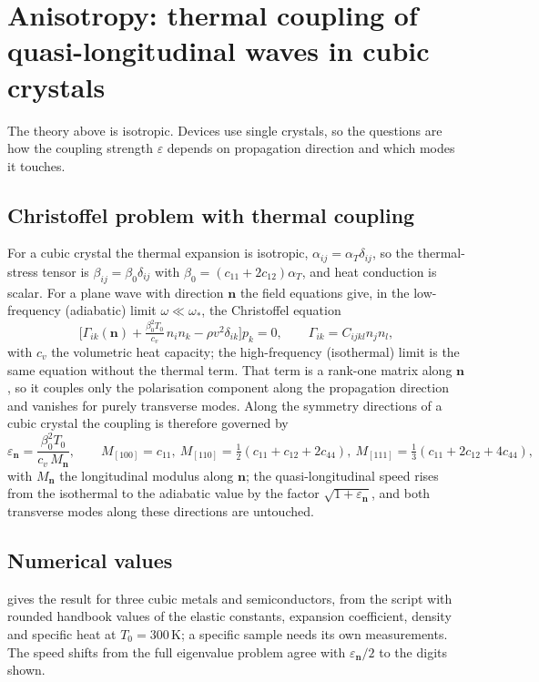 \section{Anisotropy: thermal coupling of quasi-longitudinal waves in cubic crystals}\label{sec:aniso}

The theory above is isotropic. Devices use single crystals, so the questions are how the coupling strength $\varepsilon$ depends on propagation direction and which modes it touches.

\subsection{Christoffel problem with thermal coupling}
For a cubic crystal the thermal expansion is isotropic, $\alpha_{ij}=\alpha_T\delta_{ij}$, so the thermal-stress tensor is $\beta_{ij}=\beta_0\delta_{ij}$ with $\beta_0=(c_{11}+2c_{12})\alpha_T$, and heat conduction is scalar. For a plane wave with direction $\bm n$ the field equations give, in the low-frequency (adiabatic) limit $\omega\ll\omega_*$, the Christoffel equation
\begin{equation}\label{eq:christ}
\bigl[\Gamma_{ik}(\bm n)+\tfrac{\beta_0^2T_0}{c_v}\,n_in_k-\rho v^2\delta_{ik}\bigr]p_k=0,\qquad \Gamma_{ik}=C_{ijkl}n_jn_l,
\end{equation}
with $c_v$ the volumetric heat capacity; the high-frequency (isothermal) limit is the same equation without the thermal term. That term is a rank-one matrix along $\bm n$, so it couples only the polarisation component along the propagation direction and vanishes for purely transverse modes. Along the symmetry directions of a cubic crystal the coupling is therefore governed by
\begin{equation}\label{eq:epsdir}
\varepsilon_{\bm n}=\frac{\beta_0^2T_0}{c_v\,M_{\bm n}},\qquad M_{[100]}=c_{11},\ M_{[110]}=\tfrac12(c_{11}+c_{12}+2c_{44}),\ M_{[111]}=\tfrac13(c_{11}+2c_{12}+4c_{44}),
\end{equation}
with $M_{\bm n}$ the longitudinal modulus along $\bm n$; the quasi-longitudinal speed rises from the isothermal to the adiabatic value by the factor $\sqrt{1+\varepsilon_{\bm n}}$, and both transverse modes along these directions are untouched.

\subsection{Numerical values}
 gives the result for three cubic metals and semiconductors, from the script  with rounded handbook values of the elastic constants, expansion coefficient, density and specific heat at $T_0=300$\,K; a specific sample needs its own measurements. The speed shifts from the full eigenvalue problem agree with $\varepsilon_{\bm n}/2$ to the digits shown.

